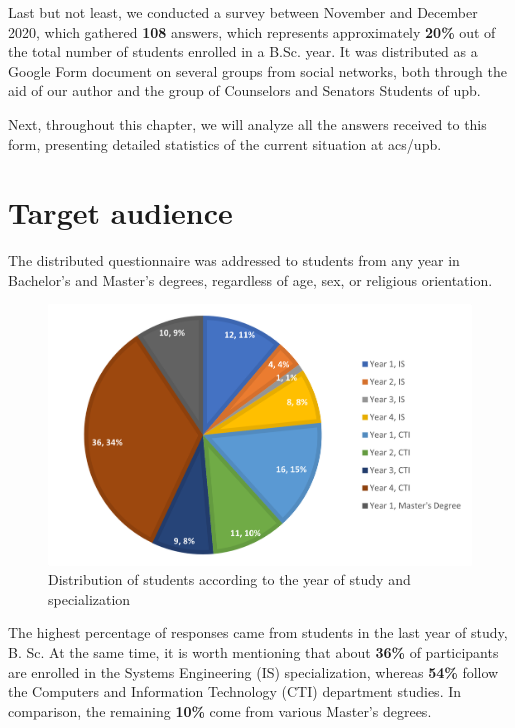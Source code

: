     Last but not least, we conducted a survey between November and December 2020, which gathered \textbf{108} answers, which represents approximately \textbf{20\%} out of the total number of students enrolled in a B.Sc. year. It was distributed as a Google Form document on several groups from social networks, both through the aid of our author and the group of Counselors and Senators Students of \acrshort{upb}.
    
    Next, throughout this chapter, we will analyze all the answers received to this form, presenting detailed statistics of the current situation at \acrshort{acs}/\acrshort{upb}.
    
\section{Target audience} \label{3:target_audience}

    The distributed questionnaire was addressed to students from any year in Bachelor's and Master's degrees, regardless of age, sex, or religious orientation.
    
    \begin{figure}[ht]
        \centering
             \includegraphics[height=0.3\textheight]{figures/charts/survey/students_distribution.png}
        \caption{Distribution of students according to the year of study and specialization}
        \label{3:fig:students_distribution}
    \end{figure}

    The highest percentage of responses came from students in the last year of study, B. Sc. At the same time, it is worth mentioning that about \textbf{36\%} of participants are enrolled in the Systems Engineering (IS) specialization, whereas \textbf{54\%} follow the Computers and Information Technology (CTI) department studies. In comparison, the remaining \textbf{10\%} come from various Master's degrees.


